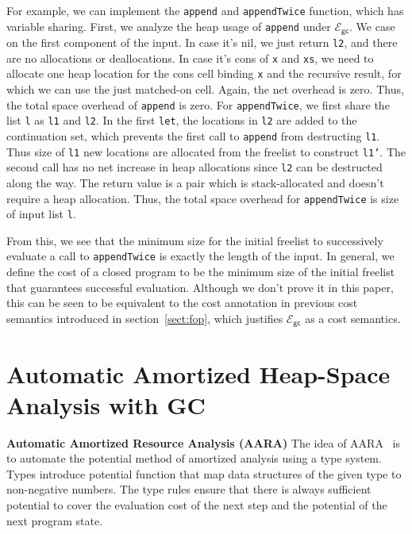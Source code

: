 \documentclass{easychair}
\newcommand{\ms}[1]{\ensuremath{\mathsf{#1}}}
\newcounter{rule}
\newcommand{\gcSem}{\ensuremath{\mathcal{E}_{\ms{gc}}}}
\theoremstyle{definition}
\begin{document}
For example, we can implement the \texttt{append} and \texttt{appendTwice} function, 
which has variable sharing. First, we analyze the heap usage of \texttt{append} under 
\gcSem{}. We case on the first component of the input. In case it's nil, 
we just return \texttt{l2}, and there are no allocations or deallocations. In case it's
cons of \texttt{x} and \texttt{xs}, we need to allocate one heap location for the
cons cell binding \texttt{x} 
and the recursive result, for which we can use the just matched-on cell. Again, 
the net overhead is zero. Thus, the total space overhead of \texttt{append} is zero.
For \texttt{appendTwice}, we first share the list \texttt{l} as \texttt{l1} and 
\texttt{l2}. In the first \texttt{let}, the locations in \texttt{l2} are added to the
continuation set, which prevents the 
first call to \texttt{append} from destructing \texttt{l1}. Thus size of \texttt{l1} 
new locations are allocated from the freelist to construct \texttt{l1'}. 
The second call has no net increase in heap allocations since \texttt{l2} can be 
destructed along the way. 
The return value is a pair which is stack-allocated and doesn't require a heap 
allocation. Thus, the total space overhead for \texttt{appendTwice} 
is size of input list \texttt{l}.

From this, we see that the minimum size for the initial freelist to successively evaluate 
a call to \texttt{appendTwice} is exactly the length of the input. In general, we 
define the cost of a closed program to be the minimum size of the initial freelist that
guarantees successful evaluation. Although we don't prove it in this paper, this can be seen
to be equivalent to the cost annotation in previous cost semantics introduced in 
section~\ref{sect:fop}, which justifies \gcSem{} as a cost semantics.

\section{Automatic Amortized Heap-Space Analysis with GC}
\label{sect:aara}

{\bf Automatic Amortized Resource Analysis (AARA)}
%
The idea of AARA~\cite{Jost03,Jost10,HoffmannAH10,HoffmannW15} is to automate the potential method of amortized
analysis using a type system.  Types introduce potential function that
map data structures of the given type to non-negative numbers. The
type rules ensure that there is always sufficient potential to cover
the evaluation cost of the next step and the potential of the
next program state.
\end{document}
